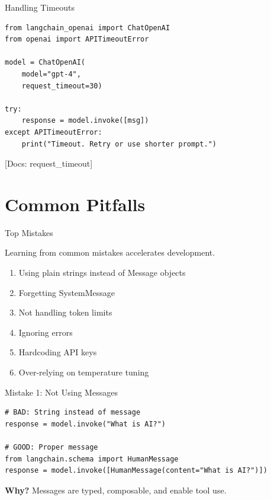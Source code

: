 \documentclass[aspectratio=169,11pt]{beamer}
\newcommand{\docref}[1]{{\scriptsize\color{docgray}[Docs: #1]}}
\begin{document}
\begin{frame}[fragile]{Handling Timeouts}
  \begin{codebox}
    \begin{lstlisting}[basicstyle=\ttfamily\tiny]
from langchain_openai import ChatOpenAI
from openai import APITimeoutError

model = ChatOpenAI(
    model="gpt-4",
    request_timeout=30)

try:
    response = model.invoke([msg])
except APITimeoutError:
    print("Timeout. Retry or use shorter prompt.")
    \end{lstlisting}
  \end{codebox}

  \docref{request\_timeout}
\end{frame}

\section{Common Pitfalls}

\begin{frame}{Top Mistakes}
  \begin{warningbox}
    Learning from common mistakes accelerates development.
  \end{warningbox}

  \begin{enumerate}
    \setlength{\itemsep}{1pt}
    \item Using plain strings instead of Message objects
    \item Forgetting SystemMessage
    \item Not handling token limits
    \item Ignoring errors
    \item Hardcoding API keys
    \item Over-relying on temperature tuning
  \end{enumerate}
\end{frame}

\begin{frame}[fragile]{Mistake 1: Not Using Messages}
  \begin{warningbox}
    \begin{lstlisting}
# BAD: String instead of message
response = model.invoke("What is AI?")

# GOOD: Proper message
from langchain.schema import HumanMessage
response = model.invoke([HumanMessage(content="What is AI?")])
    \end{lstlisting}
  \end{warningbox}

  \vspace{0.08cm}
  \textbf{Why?} Messages are typed, composable, and enable tool use.
\end{frame}
\end{document}
